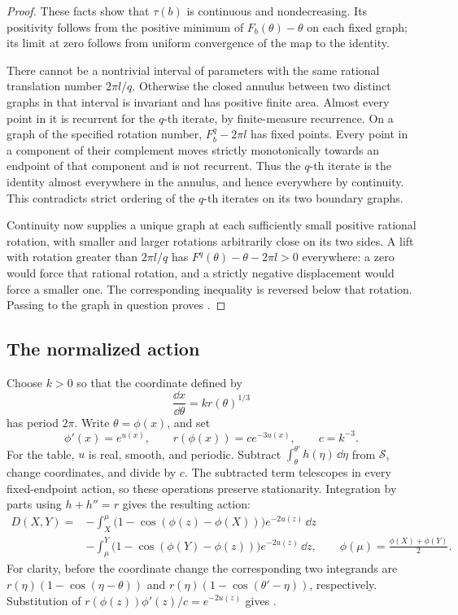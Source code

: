 \begin{proof}
These facts show that \(\tau(b)\) is continuous and nondecreasing.
Its positivity follows from the positive minimum of \(F_b(\theta)-\theta\)
on each fixed graph; its limit at zero follows from uniform convergence
of the map to the identity.

There cannot be a nontrivial interval of parameters with the same
rational translation number \(2\pi l/q\).  Otherwise the closed annulus
between two distinct graphs in that interval is invariant and has
positive finite area.  Almost every point in it is recurrent for the
\(q\)-th iterate, by finite-measure recurrence.  On a graph of the
specified rotation number, \(F_b^q-2\pi l\) has fixed points.  Every
point in a component of their complement moves strictly monotonically
towards an endpoint of that component and is not recurrent.
Thus the \(q\)-th iterate is the identity almost everywhere in the
annulus, and hence everywhere by continuity.  This contradicts strict
ordering of the \(q\)-th iterates on its two boundary graphs.

Continuity now supplies a unique graph at each sufficiently small
positive rational rotation, with smaller and larger rotations
arbitrarily close on its two sides.  A lift with rotation greater than
\(2\pi l/q\) has \(F^q(\theta)-\theta-2\pi l>0\) everywhere: a zero
would force that rational rotation, and a strictly negative displacement
would force a smaller one.  The corresponding inequality is reversed
below that rotation.  Passing to the graph in question proves
.
\end{proof}

\subsection{The normalized action}

Choose \(k>0\) so that the coordinate defined by
\[
\frac{\dd x}{\dd\theta}=k r(\theta)^{1/3}
\]
has period \(2\pi\).  Write \(\theta=\phi(x)\), and set
\begin{equation}\label{ana:normalization}
\phi'(x)=e^{u(x)},\qquad
r(\phi(x))=c e^{-3u(x)},\qquad c=k^{-3}.
\end{equation}
For the table, \(u\) is real, smooth, and periodic.  Subtract
\(\int_\theta^{\theta'}h(\eta)\,\dd\eta\) from \(\mathcal S\), change
coordinates, and divide by \(c\).  The subtracted term telescopes in
every fixed-endpoint action, so these operations preserve stationarity.
Integration by parts using \(h+h''=r\) gives the resulting action:
\begin{equation}\label{ana:normalized-action}
\begin{split}
D(X,Y)={}&-\int_X^\mu
 \bigl(1-\cos(\phi(z)-\phi(X))\bigr)e^{-2u(z)}\,\dd z\\
&-\int_\mu^Y
 \bigl(1-\cos(\phi(Y)-\phi(z))\bigr)e^{-2u(z)}\,\dd z,
\qquad
\phi(\mu)=\frac{\phi(X)+\phi(Y)}2 .
\end{split}
\end{equation}
For clarity, before the coordinate change the corresponding two
integrands are \(r(\eta)(1-\cos(\eta-\theta))\) and
\(r(\eta)(1-\cos(\theta'-\eta))\), respectively.  Substitution of
\(r(\phi(z))\phi'(z)/c=e^{-2u(z)}\) gives
.

